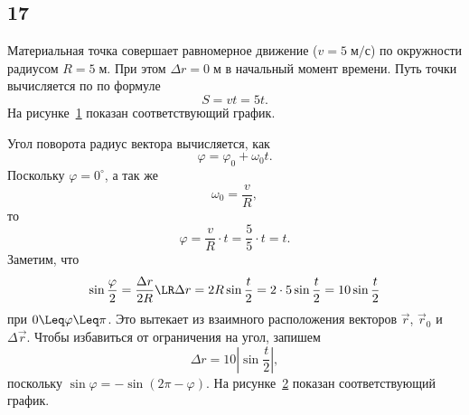 \subsection{17}

Материальная точка совершает равномерное движение ($v=5\;\text{м/с}$) по окружности радиусом $R=5\;\text{м}$. При этом $\Delta r=0\;\text{м}$ в начальный момент времени. Путь точки вычисляется по по формуле
\[
S=vt=5t.
\]
На рисунке~\ref{PicOne} показан соответствующий график.

\begin{figure}[h!]
	\begin{center}
		\caption{}\label{PicOne}
	\end{center}
\end{figure}

Угол поворота радиус вектора вычисляется, как
\[
\varphi=\varphi_0+\omega_0t.
\]
Поскольку $\varphi=0^\circ$, а так же
\[
\omega_0=\frac{v}{R},
\]
то
\[
\varphi=\frac{v}{R}\cdot t=\frac{5}{5}\cdot t=t.
\]
Заметим, что
\[
\sin\frac{\varphi}{2}=\frac{\Delta r}{2R}\LR\Delta r=2R\sin\frac{t}{2}=2\cdot5\sin\frac{t}{2}=10\sin\frac{t}{2}
\]
при $0\Leq\varphi\Leq\pi$. Это вытекает из взаимного расположения векторов $\vec r$, $\vec r_0$ и $\Delta\vec r$. Чтобы избавиться от ограничения на угол, запишем
\[
\Delta r=10\left|\sin\frac{t}{2}\right|,
\]
поскольку $\sin\varphi=-\sin(2\pi-\varphi)$. На рисунке~\ref{PicTwo} показан соответствующий график.

\begin{figure}[h!]
	\begin{center}
		\caption{}\label{PicTwo}
	\end{center}
\end{figure}

